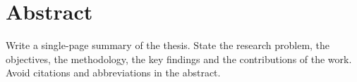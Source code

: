 \chapter*{Abstract}

Write a single-page summary of the thesis. State the research problem, the objectives, the methodology, the key findings and the contributions of the work. Avoid citations and abbreviations in the abstract.
